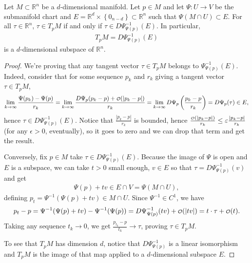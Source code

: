 \begin{prop}\label{prop:tangent-space}
	Let $M \subset \mathbb{R}^{n}$ be a $d$-dimensional manifold. Let $p \in M$ and let $\Psi: U \to V$ be the submanifold chart and $E = \mathbb{R}^{d} \times \left\{ 0_{n-d} \right\} \subset \mathbb{R}^{n}$ such that $\Psi(M \cap U) \subset E$. For all $\tau \in \mathbb{R}^{n}$, $\tau \in T_{p}M$ if and only if $\tau \in D\Psi^{-1}_{\Psi(p)}(E)$. In particular,
	\begin{align*}
		T_{p}M = D\Psi^{-1}_{\Psi(p)}(E)
	\end{align*}
	is a $d$-dimensional subspace of $\mathbb{R}^{n}$.
\end{prop}
\begin{proof}
	We're proving that any tangent vector $\tau \in T_{p}M$ belongs to $\Psi^{-1}_{\Psi(p)} (E)$. Indeed, consider that for some sequence $p_{k}$ and $r_{k}$ giving a tangent vector $\tau \in T_{p}M$,
	\begin{align*}
		\lim_{k \to \infty} \frac{\Psi(p_{k}) - \Psi(p)}{r_{k}} = \lim_{k \to \infty} \frac{D \Psi_{p}(p_{k} - p) + \smalO(\left| p_{k} - p \right|)}{r_{k}} =  \lim_{k \to \infty} D \Psi_{p} \left( \frac{p_{k} - p}{r_{k}} \right) = D \Psi_{p} ( \tau) \in E,
	\end{align*}
    hence $\tau \in D \Psi^{-1}_{\Psi(p)}(E)$. Notice that $\frac{|p_{k} - p|}{r_{k}}$ is bounded, hence $\frac{\smalO(|p_{k} - p|)}{r_{k}} \leq \epsilon \frac{|p_{k} - p|}{r_{k}}$ (for any $\epsilon > 0$, eventually), so it goes to zero and we can drop that term and get the result.

    Conversely, fix $p \in M$ take $\tau \in D \Psi^{-1}_{\Psi(p)}(E)$. Because the image of $\Psi$ is open and $E$ is a subspace, we can take $t > 0$ small enough, $v \in E$ so that $\tau = D \Psi^{-1}_{\Psi(p)}(v)$ and get
    \begin{align*}
        \Psi(p) + tv \in E \cap V = \Psi(M \cap U),
    \end{align*}
    defining $p_{t} = \Psi^{-1}(\Psi(p) + tv) \in M \cap U$. Since $\Psi^{-1} \in C^{1}$, we have 
    \begin{align*}
        p_{t} - p  = \Psi^{-1}(\Psi(p) + tv) - \Psi^{-1}( \Psi(p)) = D \Psi^{-1}_{\Psi(p)}(tv) + \smalO(\left| tv \right|) = t \cdot \tau + \smalO(t). 
    \end{align*}
    Taking any sequence $t_{k} \to 0$, we get $\frac{p_{t_{k}}  -p}{t_{k}} \to \tau$, proving $\tau \in T_{p}M$.

    To see that $T_{p}M$ has dimension $d$, notice that $D \Psi^{-1}_{\Psi(p)}$ is a linear isomorphism and $T_{p}M$ is the image of that map applied to a $d$-dimensional subspace $E$. 
\end{proof}

